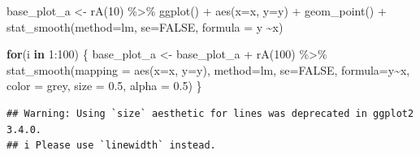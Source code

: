 \documentclass[
]{book}
\newenvironment{Shaded}{\begin{snugshade}}{\end{snugshade}}
\newcommand{\AttributeTok}[1]{\textcolor[rgb]{0.77,0.63,0.00}{#1}}
\newcommand{\ConstantTok}[1]{\textcolor[rgb]{0.00,0.00,0.00}{#1}}
\newcommand{\ControlFlowTok}[1]{\textcolor[rgb]{0.13,0.29,0.53}{\textbf{#1}}}
\newcommand{\DecValTok}[1]{\textcolor[rgb]{0.00,0.00,0.81}{#1}}
\newcommand{\FloatTok}[1]{\textcolor[rgb]{0.00,0.00,0.81}{#1}}
\newcommand{\FunctionTok}[1]{\textcolor[rgb]{0.00,0.00,0.00}{#1}}
\newcommand{\NormalTok}[1]{#1}
\newcommand{\OtherTok}[1]{\textcolor[rgb]{0.56,0.35,0.01}{#1}}
\newcommand{\SpecialCharTok}[1]{\textcolor[rgb]{0.00,0.00,0.00}{#1}}
\newcommand{\StringTok}[1]{\textcolor[rgb]{0.31,0.60,0.02}{#1}}
\theoremstyle{definition}
\theoremstyle{definition}
\theoremstyle{definition}
\theoremstyle{definition}
\theoremstyle{remark}
\begin{document}
\begin{Shaded}
\begin{Highlighting}[]
\NormalTok{base\_plot\_a }\OtherTok{\textless{}{-}} \FunctionTok{rA}\NormalTok{(}\DecValTok{10}\NormalTok{) }\SpecialCharTok{\%\textgreater{}\%}  
  \FunctionTok{ggplot}\NormalTok{() }\SpecialCharTok{+} 
  \FunctionTok{aes}\NormalTok{(}\AttributeTok{x=}\NormalTok{x, }\AttributeTok{y=}\NormalTok{y) }\SpecialCharTok{+} 
  \FunctionTok{geom\_point}\NormalTok{() }\SpecialCharTok{+} 
  \FunctionTok{stat\_smooth}\NormalTok{(}\AttributeTok{method=}\StringTok{\textquotesingle{}lm\textquotesingle{}}\NormalTok{, }\AttributeTok{se=}\ConstantTok{FALSE}\NormalTok{, }\AttributeTok{formula =} \StringTok{\textquotesingle{}y \textasciitilde{}x\textquotesingle{}}\NormalTok{)}

\ControlFlowTok{for}\NormalTok{(i }\ControlFlowTok{in} \DecValTok{1}\SpecialCharTok{:}\DecValTok{100}\NormalTok{) \{ }
\NormalTok{    base\_plot\_a }\OtherTok{\textless{}{-}}\NormalTok{ base\_plot\_a }\SpecialCharTok{+} \FunctionTok{rA}\NormalTok{(}\DecValTok{100}\NormalTok{) }\SpecialCharTok{\%\textgreater{}\%} 
      \FunctionTok{stat\_smooth}\NormalTok{(}\AttributeTok{mapping =} \FunctionTok{aes}\NormalTok{(}\AttributeTok{x=}\NormalTok{x, }\AttributeTok{y=}\NormalTok{y), }\AttributeTok{method=}\StringTok{\textquotesingle{}lm\textquotesingle{}}\NormalTok{, }\AttributeTok{se=}\ConstantTok{FALSE}\NormalTok{, }\AttributeTok{formula=}\StringTok{\textquotesingle{}y\textasciitilde{}x\textquotesingle{}}\NormalTok{, }\AttributeTok{color =} \StringTok{\textquotesingle{}grey\textquotesingle{}}\NormalTok{, }\AttributeTok{size =} \FloatTok{0.5}\NormalTok{, }\AttributeTok{alpha =} \FloatTok{0.5}\NormalTok{)}
\NormalTok{\}}
\end{Highlighting}
\end{Shaded}

\begin{verbatim}
## Warning: Using `size` aesthetic for lines was deprecated in ggplot2 3.4.0.
## i Please use `linewidth` instead.
\end{verbatim}
\end{document}
